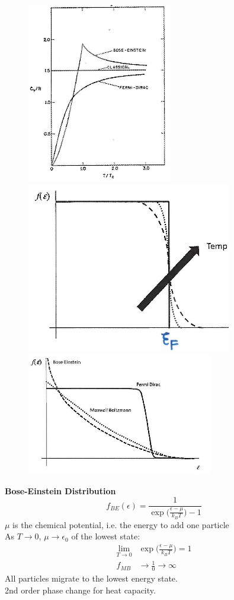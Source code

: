 \documentclass[a4paper, 11pt, normalem]{report}
\begin{document}
\begin{figure}
    \begin{center}
        \includegraphics[scale=0.6]{BoseEinstein.png} \\
        \includegraphics[scale=0.5]{FermiDirac.png} \\
        \includegraphics[scale=0.6]{Limits.png}
    \end{center}
\end{figure}

\textbf{Bose-Einstein Distribution}
\begin{equation*}
    f_{BE}(\epsilon) = \frac{1}{\exp\big(\tfrac{\epsilon - \mu}{k_B T}\big) - 1}
\end{equation*}
$\mu$ is the chemical potential, i.e. the energy to add one particle \\
As $T \to 0$, $\mu \to \epsilon_0$ of the lowest state:
\begin{align*}
    \lim_{T\to0}& \exp\Big(\frac{\epsilon - \mu}{k_B T}\Big) = 1 \\
    f_{MB} &\to \frac{1}{0} \to \infty
\end{align*}
All particles migrate to the lowest energy state. \\
2nd order phase change for heat capacity.
\end{document}
